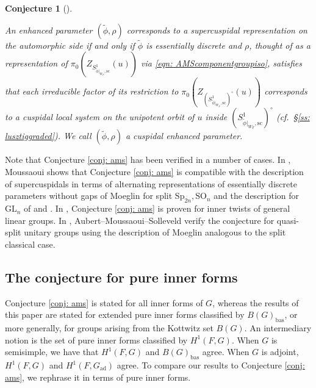 \documentclass{amsart}
\newtheorem{conjecture}[theorem]{Conjecture}
\theoremstyle{definition}
\theoremstyle{remark}
\numberwithin{equation}{section}
\newcommand{\Sc}{\mathrm{sc}}
\newcommand{\ad}{\mathrm{ad}}
\newcommand{\bas}{\mathrm{bas}}
\newcommand{\GL}{\mathrm{GL}}
\newcommand{\Sp}{\mathrm{Sp}}
\newcommand{\SO}{\mathrm{SO}}
\begin{document}
\begin{conjecture}[{\cite[Conjecture 6.10]{AMS1}}]{\label{conj: ams}}

An enhanced parameter $(\tilde{\phi}, \rho)$ corresponds to a supercuspidal representation on the automorphic side if and only if $\tilde{\phi}$ is essentially discrete and $\rho$, thought of as a representation of $\pi_0(Z_{S^1_{\tilde{\phi}|_{W_F}, \Sc}}(u))$ via \eqref{eqn: AMScomponentgroupiso}, satisfies that each irreducible factor of its restriction to $\pi_0(Z_{(S^1_{\tilde{\phi}|_{W_F}, \Sc})^{\circ}}(u))$ corresponds to a cuspidal local system on the unipotent orbit of $u$ inside $(S^1_{\tilde{\phi}|_{W_F}, \Sc})^{\circ}$ (cf.~\S\ref{ss: lusztiggraded}). We call $(\tilde{\phi}, \rho)$ a cuspidal enhanced parameter.
\end{conjecture}


Note that Conjecture \ref{conj: ams} has been verified in a number of cases. In \cite[Proposition 3.6]{Moussaouicusp}, Moussaoui shows that Conjecture \ref{conj: ams} is compatible with the description of supercuspidals in terms of alternating representations of essentially discrete parameters without gaps of Moeglin \cite[Theorem 2.5.1]{Moeglinmultiplicityone} for split $\Sp_{2n}, \SO_n$ and the description for $\GL_n$ of \cite{HT1} and \cite{Henniart}. In \cite[Example 6.11]{AMS1}, Conjecture \ref{conj: ams} is proven for inner twists of general linear groups. In \cite[Example 6.13]{AMS1}, Aubert--Moussaoui--Solleveld verify the conjecture for quasi-split unitary groups using the description of Moeglin \cite[Theorem 8.4.4]{Moeglindiscunitary} analogous to the split classical case.

\subsection{The conjecture for pure inner forms}

Conjecture \ref{conj: ams} is stated for all inner forms of $G$, whereas the results of this paper are stated for extended pure inner forms classified by $B(G)_{\bas}$, or more generally, for groups arising from the Kottwitz set $B(G)$. An intermediary notion is the set of pure inner forms classified by $H^1(F,G)$. When $G$ is semisimple, we have that $H^1(F,G)$ and $B(G)_{\bas}$ agree. When $G$ is adjoint, $H^1(F,G)$ and $H^1(F, G_{\ad})$ agree. To compare our results to Conjecture \ref{conj: ams}, we rephrase it in terms of pure inner forms. 
\end{document}
